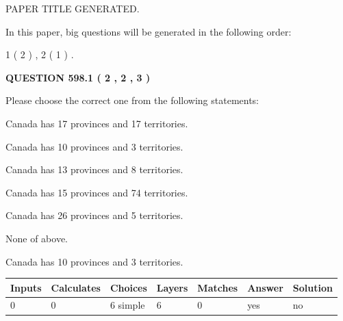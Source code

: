 \documentclass[12pt]{article}
\begin{document}
   
   
   
   
   
 \vspace{0.2in}
 
 
 
 
   
   
 PAPER TITLE GENERATED.
   
   
   
\vspace{0.2in}
   
In this paper, big questions will be generated in the following order: 
   
   
   1 ( 2 )
 ,
   2 ( 1 )
 .
  
\vspace{0.2in}
  
{\textbf{\Large{QUESTION
598.1 
 ( 2 , 2 , 3 )
}}}
  
  
Please choose the correct one from the following statements:
 
 
Canada has  17 provinces and  17 territories.
 
 
Canada has 10  provinces and 3 territories.
 
 
Canada has  13 provinces and  8 territories.
 
 
Canada has  15 provinces and  74 territories.
 
 
Canada has  26 provinces and  5 territories.
 
 
 None of above.
 
 
\noindent{}
 
 
Canada has 10  provinces and 3 territories.
 
 
\noindent{}
 
 
   
   
   
   
\noindent\begin{tabular}{|l|l|l|l|l|l|l|}
 \hline
Inputs & Calculates & Choices & Layers & Matches & Answer & Solution \\ \hline
 0  & 
 0  & 
 6
  simple  
  & 
 6  & 
 0  & 
  yes & 
  no 
  \\ \hline
 \end{tabular}
   
\end{document}
